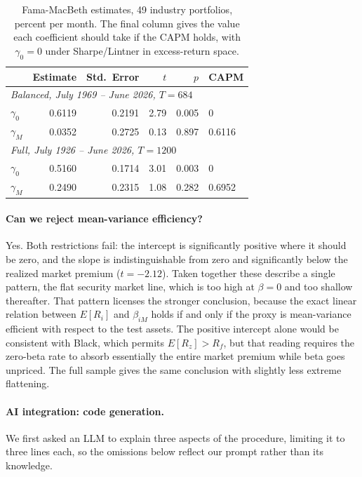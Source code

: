 \begin{table}[H]
\centering
\caption{Fama-MacBeth estimates, 49 industry portfolios, percent per month.
The final column gives the value each coefficient should take if the CAPM
holds, with $\gamma_0 = 0$ under Sharpe\slash Lintner in excess-return space.}
\small
\begin{tabular}{lrrrrl}
\toprule
& Estimate & Std.\ Error & $t$ & $p$ & CAPM \\
\midrule
\multicolumn{6}{l}{\textit{Balanced, July 1969 -- June 2026, $T = 684$}} \\
$\gamma_0$ & 0.6119 & 0.2191 & 2.79 & 0.005 & 0 \\
$\gamma_M$ & 0.0352 & 0.2725 & 0.13 & 0.897 & 0.6116 \\
\midrule
\multicolumn{6}{l}{\textit{Full, July 1926 -- June 2026, $T = 1200$}} \\
$\gamma_0$ & 0.5160 & 0.1714 & 3.01 & 0.003 & 0 \\
$\gamma_M$ & 0.2490 & 0.2315 & 1.08 & 0.282 & 0.6952 \\
\bottomrule
\end{tabular}
\label{tab:fmb}
\end{table}

\paragraph{Can we reject mean-variance efficiency?} Yes. Both restrictions
fail: the intercept is significantly positive where it should be zero, and the
slope is indistinguishable from zero and significantly below the realized
market premium ($t = -2.12$). Taken together these describe a single pattern,
the flat security market line, which is too high at $\beta = 0$ and too shallow
thereafter. That pattern licenses the stronger conclusion, because the exact
linear relation between $E[R_i]$ and $\beta_{iM}$ holds if and only if the
proxy is mean-variance efficient with respect to the test assets. The positive
intercept alone would be consistent with Black, which permits $E[R_z] > R_f$,
but that reading requires the zero-beta rate to absorb essentially the entire
market premium while beta goes unpriced. The full sample gives the same
conclusion with slightly less extreme flattening.

\paragraph{AI integration: code generation.} We first asked an LLM to explain
three aspects of the procedure, limiting it to three lines each, so the
omissions below reflect our prompt rather than its knowledge.


